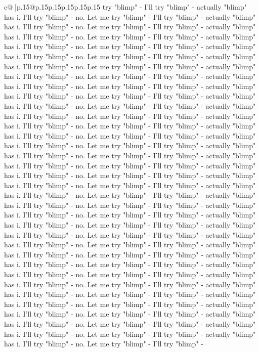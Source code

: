 \documentclass{article}
\begin{document}
{\begin{supertabular}{c@{$\;$}|p{.15\linewidth}@{}p{.15\linewidth}p{.15\linewidth}p{.15\linewidth}p{.15\linewidth}p{.15\linewidth}}
{{{try "blimp" {-} I'll try "blimp" {-} actually "blimp" has i. I'll try "blimp" {-} no. Let me try "blimp" {-} I'll try "blimp" {-} actually "blimp" has i. I'll try "blimp" {-} no. Let me try "blimp" {-} I'll try "blimp" {-} actually "blimp" has i. I'll try "blimp" {-} no. Let me try "blimp" {-} I'll try "blimp" {-} actually "blimp" has i. I'll try "blimp" {-} no. Let me try "blimp" {-} I'll try "blimp" {-} actually "blimp" has i. I'll try "blimp" {-} no. Let me try "blimp" {-} I'll try "blimp" {-} actually "blimp" has i. I'll try "blimp" {-} no. Let me try "blimp" {-} I'll try "blimp" {-} actually "blimp" has i. I'll try "blimp" {-} no. Let me try "blimp" {-} I'll try "blimp" {-} actually "blimp" has i. I'll try "blimp" {-} no. Let me try "blimp" {-} I'll try "blimp" {-} actually "blimp" has i. I'll try "blimp" {-} no. Let me try "blimp" {-} I'll try "blimp" {-} actually "blimp" has i. I'll try "blimp" {-} no. Let me try "blimp" {-} I'll try "blimp" {-} actually "blimp" has i. I'll try "blimp" {-} no. Let me try "blimp" {-} I'll try "blimp" {-} actually "blimp" has i. I'll try "blimp" {-} no. Let me try "blimp" {-} I'll try "blimp" {-} actually "blimp" has i. I'll try "blimp" {-} no. Let me try "blimp" {-} I'll try "blimp" {-} actually "blimp" has i. I'll try "blimp" {-} no. Let me try "blimp" {-} I'll try "blimp" {-} actually "blimp" has i. I'll try "blimp" {-} no. Let me try "blimp" {-} I'll try "blimp" {-} actually "blimp" has i. I'll try "blimp" {-} no. Let me try "blimp" {-} I'll try "blimp" {-} actually "blimp" has i. I'll try "blimp" {-} no. Let me try "blimp" {-} I'll try "blimp" {-} actually "blimp" has i. I'll try "blimp" {-} no. Let me try "blimp" {-} I'll try "blimp" {-} actually "blimp" has i. I'll try "blimp" {-} no. Let me try "blimp" {-} I'll try "blimp" {-} actually "blimp" has i. I'll try "blimp" {-} no. Let me try "blimp" {-} I'll try "blimp" {-} actually "blimp" has i. I'll try "blimp" {-} no. Let me try "blimp" {-} I'll try "blimp" {-} actually "blimp" has i. I'll try "blimp" {-} no. Let me try "blimp" {-} I'll try "blimp" {-} actually "blimp" has i. I'll try "blimp" {-} no. Let me try "blimp" {-} I'll try "blimp" {-} actually "blimp" has i. I'll try "blimp" {-} no. Let me try "blimp" {-} I'll try "blimp" {-} actually "blimp" has i. I'll try "blimp" {-} no. Let me try "blimp" {-} I'll try "blimp" {-} actually "blimp" has i. I'll try "blimp" {-} no. Let me try "blimp" {-} I'll try "blimp" {-} actually "blimp" has i. I'll try "blimp" {-} no. Let me try "blimp" {-} I'll try "blimp" {-} actually "blimp" has i. I'll try "blimp" {-} no. Let me try "blimp" {-} I'll try "blimp" {-} actually "blimp" has i. I'll try "blimp" {-} no. Let me try "blimp" {-} I'll try "blimp" {-} actually "blimp" has i. I'll try "blimp" {-} no. Let me try "blimp" {-} I'll try "blimp" {-} actually "blimp" has i. I'll try "blimp" {-} no. Let me try "blimp" {-} I'll try "blimp" {-} actually "blimp" has i. I'll try "blimp" {-} no. Let me try "blimp" {-} I'll try "blimp" {-} actually "blimp" has i. I'll try "blimp" {-} no. Let me try "blimp" {-} I'll try "blimp" {-} actually "blimp" has i. I'll try "blimp" {-} no. Let me try "blimp" {-} I'll try "blimp" {-} }}}
\end{supertabular}}
\end{document}
